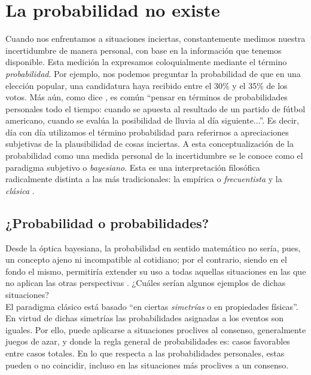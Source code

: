 \chapter{La probabilidad no existe}
	
Cuando nos enfrentamos a situaciones inciertas, constantemente medimos nuestra incertidumbre de manera personal, con base en la información que tenemos disponible. Esta medición la expresamos coloquialmente mediante el término \textit{probabilidad}. Por ejemplo, nos podemos preguntar la probabilidad de que en una elección popular, una candidatura haya recibido entre el 30\% y el 35\% de los votos. Más aún, como dice \textcite{Berger85}, es común ``pensar en términos de probabilidades personales todo el tiempo: cuando se apuesta al resultado de un partido de fútbol americano, cuando se evalúa la posibilidad de lluvia al día siguiente...''. Es decir, día con día utilizamos el término probabilidad para referirnos a apreciaciones subjetivas de la plausibilidad de cosas inciertas. A esta conceptualización de la probabilidad como una medida personal de la incertidumbre se le conoce como el paradigma subjetivo o \textit{bayesiano}. Esta es una interpretación filosófica radicalmente distinta a las más tradicionales: la empírica o \textit{frecuentista} y la \textit{clásica} \parencite{Nozer17,GP16}. 
	
\section{¿Probabilidad o probabilidades?}

Desde la óptica bayesiana, la probabilidad en sentido matemático no sería, pues, un concepto ajeno ni incompatible al cotidiano; por el contrario, siendo en el fondo el mismo, permitiría extender su uso a todas aquellas situaciones en las que no aplican las otras perspectivas \parencite{Berger85,GP16}. ¿Cuáles serían algunos ejemplos de dichas situaciones?\\
	
El paradigma clásico está basado ``en ciertas \textit{simetrías} o en propiedades físicas''\parencite{GP16}. En virtud de dichas simetrías las probabilidades asignadas a los eventos son iguales. Por ello, puede aplicarse a situaciones proclives al consenso, generalmente juegos de azar, y donde la regla general de probabilidades es: casos favorables entre casos totales. En lo que respecta a las probabilidades personales, estas pueden o no coincidir, incluso en las situaciones más proclives a un consenso.\\ 
	

